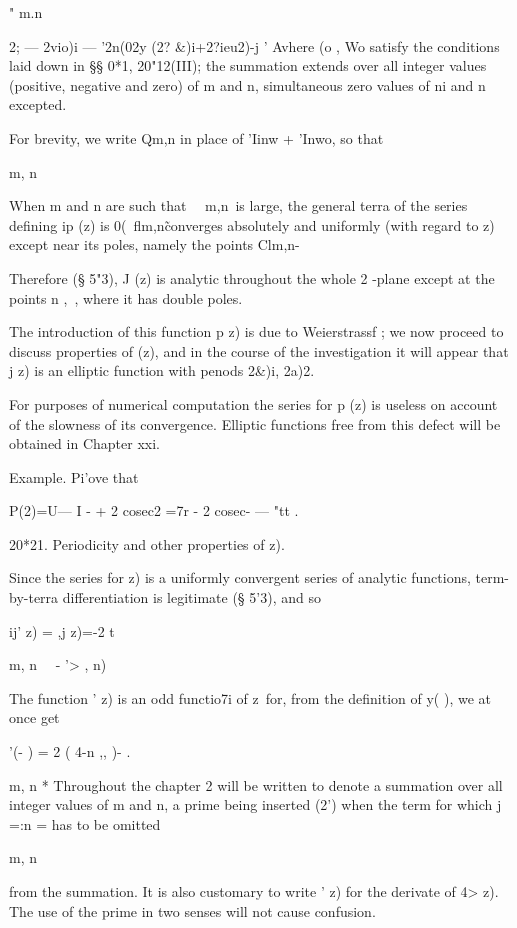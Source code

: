  " m.n \ \ {2; — 2vio)i — '2n(02y (2? \&)i+2?ieu2)-j ' Avhere (o , Wo
satisfy the conditions laid down in §§ 0*1, 20"12(III); the summation
extends over all integer values (positive, negative and zero) of m and
n, simultaneous zero values of ni and n excepted.

For brevity, we write Qm,n in place of 'Iinw + 'Inwo, so that

m, n

When m and n are such that \ \ m,n\ is large, the general terra of the
series defining ip (z) is 0(\ flm,n\~%
converges absolutely and uniformly (with regard to z) except near its
poles, namely the points Clm,n-

Therefore (§ 5"3), J (z) is analytic throughout the whole 2 -plane
except at the points n ,\ , where it has double poles.

The introduction of this function p z) is due to Weierstrassf ; we now
proceed to discuss properties of (z), and in the course of the
investigation it will appear that j z) is an elliptic function with
penods 2\&)i, 2a)2.

For purposes of numerical computation the series for p (z) is useless
on account of the slowness of its convergence. Elliptic functions free
from this defect will be obtained in Chapter xxi.

Example. Pi'ove that

P(2)=U— I - + 2 cosec2 =7r - 2 cosec- — "tt .

20*21. Periodicity and other properties of z).

Since the series for z) is a uniformly convergent series of analytic
functions, term-by-terra differentiation is legitimate (§ 5'3), and so

ij' z) = ,j z)=-2 t



  m, n \ \ - '> , n)

The function ' z) is an odd functio7i of z\ for, from the definition
of y( ), we at once get

 '(- ) = 2 ( 4-n ,, )- .

m, n * Throughout the chapter 2 will be written to denote a summation
over all integer values of m and n, a prime being inserted (2') when
the term for which j =:n = has to be omitted

m, n

from the summation. It is also customary to write ' z) for the
derivate of 4> z). The use of the prime in two senses will not cause
confusion.

}
